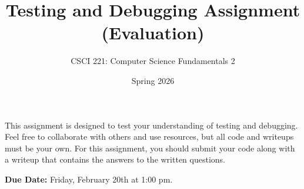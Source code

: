 \documentclass[answers]{exam}
\begin{document}
\title{Testing and Debugging Assignment (Evaluation)}
\author{CSCI 221: Computer Science Fundamentals 2}
\date{Spring 2026}
\maketitle


This assignment is designed to test your understanding of testing and debugging. 
Feel free to collaborate with others and use resources, but all code and writeups must be your own. 
For this assignment, you should submit your code along with a writeup that contains the answers to the written questions. 

\textbf{Due Date:}
Friday, February 20th at 1:00 pm. 
\end{document}

